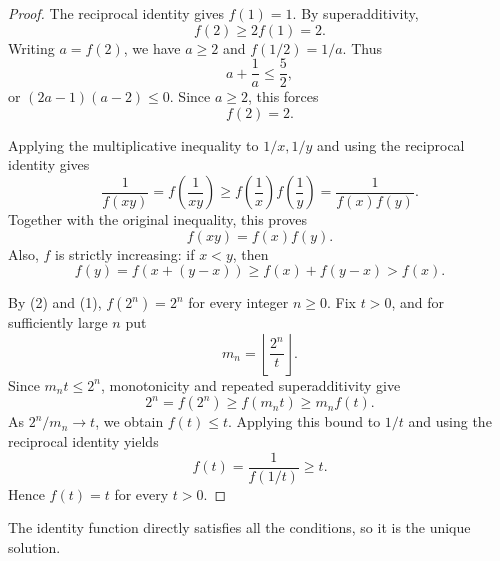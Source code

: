 
\begin{dlsummary}[title={\bfseries Solution 10. The Reciprocal Pinch},breakable]

\begin{proof}
The reciprocal identity gives $f(1)=1$. By superadditivity,
\[
f(2)\geq 2f(1)=2.
\]
Writing $a=f(2)$, we have $a\geq2$ and $f(1/2)=1/a$. Thus
\[
a+\frac1a\leq\frac52,
\]
or $(2a-1)(a-2)\leq0$. Since $a\geq2$, this forces
\[
f(2)=2. \tag{1}
\]

Applying the multiplicative inequality to $1/x,1/y$ and using the
reciprocal identity gives
\[
\frac1{f(xy)}=f\left(\frac1{xy}\right)
\geq f\left(\frac1x\right)f\left(\frac1y\right)
=\frac1{f(x)f(y)}.
\]
Together with the original inequality, this proves
\[
f(xy)=f(x)f(y). \tag{2}
\]
Also, $f$ is strictly increasing: if $x<y$, then
\[
f(y)=f(x+(y-x))\geq f(x)+f(y-x)>f(x).
\]

By (2) and (1), $f(2^n)=2^n$ for every integer $n\geq0$. Fix $t>0$,
and for sufficiently large $n$ put
\[
m_n=\left\lfloor\frac{2^n}{t}\right\rfloor.
\]
Since $m_nt\leq2^n$, monotonicity and repeated superadditivity give
\[
2^n=f(2^n)\geq f(m_nt)\geq m_nf(t).
\]
As $2^n/m_n\to t$, we obtain $f(t)\leq t$. Applying this bound to
$1/t$ and using the reciprocal identity yields
\[
f(t)=\frac1{f(1/t)}\geq t.
\]
Hence $f(t)=t$ for every $t>0$.
\end{proof}

The identity function directly satisfies all the conditions, so it is
the unique solution.

\end{dlsummary}